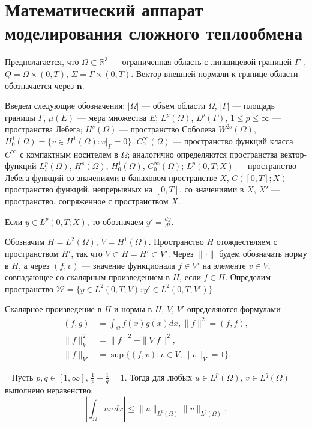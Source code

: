 \section{Математический аппарат моделирования сложного теплообмена}
\label{sec:ch1/sec6}
Предполагается, что $\Omega \subset \mathbb{R}^3$ — ограниченная
область с липшицевой границей $\Gamma$~\cite[с.~232]{Zeidler1986},
$Q = \Omega \times (0, T)$, $\Sigma = \Gamma \times (0, T)$.
Вектор внешней нормали к границе области обозначается через $\mathbf{n}$.

Введем следующие обозначения: $|\Omega|$ — объем области $\Omega$,
$|\Gamma|$ — площадь границы $\Gamma$, $\mu(E)$ — мера множества $E$;
$L^p(\Omega)$, $L^p(\Gamma)$, $1 \le p \le \infty$ — пространства Лебега;
$H^s(\Omega)$ — пространство Соболева $W^{2s}(\Omega)$,
$H^1_0(\Omega) = \{v \in H^1(\Omega) : v|_\Gamma = 0\}$,
$C^\infty_0(\Omega)$ — пространство функций класса $C^\infty$
с компактным носителем в $\Omega$; аналогично определяются пространства
вектор-функций $L^p_s(\Omega)$, $H^s(\Omega)$, $H^1_0(\Omega)$,
$C^\infty_0(\Omega)$; $L^p(0, T; X)$ — пространство Лебега функций
со значениями в банаховом пространстве $X$, $C([0, T]; X)$ — пространство
функций, непрерывных на $[0, T]$, со значениями в $X$, $X'$ — пространство,
сопряженное с пространством $X$.

Если $y \in L^p(0, T; X)$, то обозначаем $y' = \frac{dy}{dt}$.

Обозначим $H = L^2(\Omega)$, $V = H^1(\Omega)$.
Пространство $H$ отождествляем с пространством $H'$,
так что $V \subset H = H' \subset V'$.
Через $\| \cdot \|$ будем обозначать норму в $H$,
а через $(f, v)$ — значение функционала $f \in V'$ на элементе
$v \in V$, совпадающее со скалярным произведением в $H$,
если $f \in H$.
Определим пространство $\mathcal{W} = \{ y \in L^2(0, T; V):
y' \in L^2(0, T, V') \}$.

Скалярное произведение в $H$ и нормы в $H$,
$V$, $V'$ определяются формулами
\begin{align*}
(f, g)
    &= \int_\Omega f(x)g(x) dx, \| f \|^2 = (f, f), \\
    \| f \|^2_{V} &= \| f \|^2 + \| \nabla f \|^2, \\
    \| f \|_{V'} &= \sup \{ (f, v):
    v \in V, \|v\|_{V} = 1 \}.
\end{align*}


\begin{lemma}
    \label{lemma:hoelder}~\cite[с.~35]{Zeidler1990b}
    Пусть $p, q \in [1, \infty]$, $\frac{1}{p} + \frac{1}{q} = 1$.
    Тогда для любых $u \in L^p(\Omega)$, $v \in L^q(\Omega)$
    выполнено неравенство:
    \[
        \left| \int_\Omega uv \, dx \right|
        \le \|u\|_{L^p(\Omega)} \|v\|_{L^q(\Omega)}.
    \]
\end{lemma}

